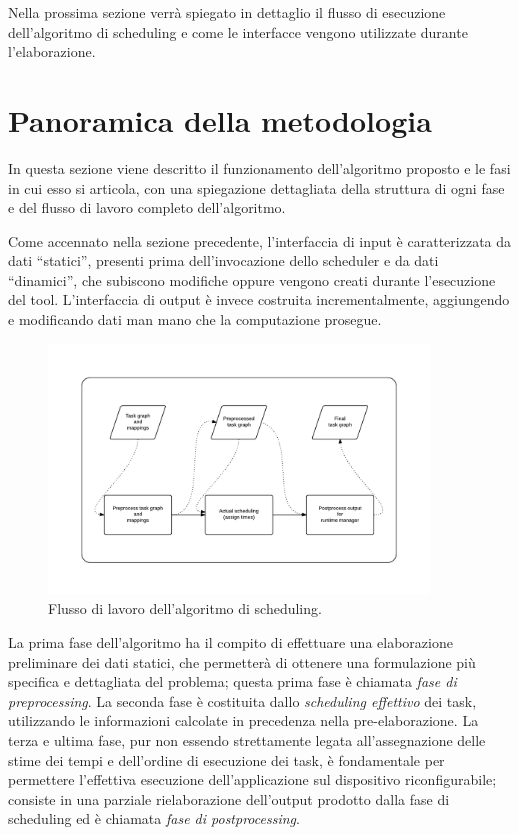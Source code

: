 Nella prossima sezione verrà spiegato in dettaglio il flusso di 
esecuzione dell'algoritmo di scheduling e come le interfacce vengono 
utilizzate durante l'elaborazione.


\section{Panoramica della metodologia}
\label{sec:panoramicaMetodologia}

In questa sezione viene descritto il funzionamento dell'algoritmo proposto e le 
fasi in cui esso si articola, con una spiegazione dettagliata della struttura 
di ogni fase e del flusso di lavoro completo dell'algoritmo.

Come accennato nella sezione precedente, l'interfaccia di input è 
caratterizzata da dati ``statici'', presenti prima dell'invocazione dello 
scheduler e da dati ``dinamici'', che subiscono modifiche oppure vengono creati 
durante l'esecuzione del tool. L'interfaccia di output è invece costruita 
incrementalmente, aggiungendo e modificando dati man mano che la computazione 
prosegue.


\begin{figure}[ht]
 \begin{center}
\includegraphics[width=0.9\textwidth]
{capitoli/figure/cap3/SchedulerWorkflow.pdf}
  \caption{Flusso di lavoro dell'algoritmo di scheduling.}
  \label{fig:schedulerWorkflow}
 \end{center}
\end{figure}


La prima fase dell'algoritmo ha il compito di 
effettuare una elaborazione preliminare dei dati statici, che permetterà di 
ottenere una formulazione più specifica e dettagliata del problema; questa 
prima fase è chiamata \emph{fase di preprocessing}. La seconda fase è 
costituita dallo \emph{scheduling effettivo} dei task, utilizzando le 
informazioni calcolate in precedenza nella pre-elaborazione. La terza e ultima 
fase, pur non essendo strettamente legata all'assegnazione delle stime dei tempi 
e dell'ordine di esecuzione dei task, è fondamentale per permettere l'effettiva 
esecuzione dell'applicazione sul dispositivo riconfigurabile; consiste in una 
parziale rielaborazione dell'output prodotto dalla fase di scheduling ed è 
chiamata \emph{fase di postprocessing}.

